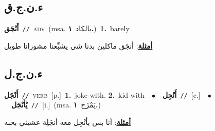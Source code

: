 \documentclass[10pt,a4paper,twoside]{article} %
\begin{document}
\begin{multicols}{2}
\vspace{-3mm}
\subsection*{\color{blue}\foreignlanguage{arabic}{ء.ن.ج.ق}\color{blue}{ (ntws)}} 

{\setlength\topsep{0pt}\textbf{\foreignlanguage{arabic}{أَنْجَق}}\ {\color{gray}\texttt{//}\color{black}}\ \textsc{adv}\ \color{gray}(msa. \foreignlanguage{arabic}{بالكاد}~\foreignlanguage{arabic}{\textbf{١.}})\color{black}\ \textbf{1.}~barely\  \begin{flushright}\color{gray}\foreignlanguage{arabic}{\textbf{\underline{\foreignlanguage{arabic}{أمثلة}}}: أنجَق ماكلين بدنا شي يشبِّعنا مشورانا طويل}\end{flushright}\color{black}} \vspace{2mm}

\vspace{-3mm}
\subsection*{\color{blue}\foreignlanguage{arabic}{ء.ن.ج.ل}\color{blue}{ (ntws)}} 

{\setlength\topsep{0pt}\textbf{\foreignlanguage{arabic}{أَنْجَل}}\ {\color{gray}\texttt{//}\color{black}}\ \textsc{verb}\ [p.]\ \textbf{1.}~joke with.  \textbf{2.}~kid with\ \ $\bullet$\ \ \setlength\topsep{0pt}\textbf{\foreignlanguage{arabic}{أَنْجِل}}\ {\color{gray}\texttt{//}\color{black}}\ [c.]\ \ $\bullet$\ \ \setlength\topsep{0pt}\textbf{\foreignlanguage{arabic}{يْأَنْجَل}}\ {\color{gray}\texttt{//}\color{black}}\ [i.]\ \color{gray}(msa. \foreignlanguage{arabic}{يَمْزَح}~\foreignlanguage{arabic}{\textbf{١.}})\color{black}\  \begin{flushright}\color{gray}\foreignlanguage{arabic}{\textbf{\underline{\foreignlanguage{arabic}{أمثلة}}}: أنا بس بأنْجِل معه أنجَلِة عشيني بحبه}\end{flushright}\color{black}} \vspace{2mm}


\end{multicols}
\end{document}
